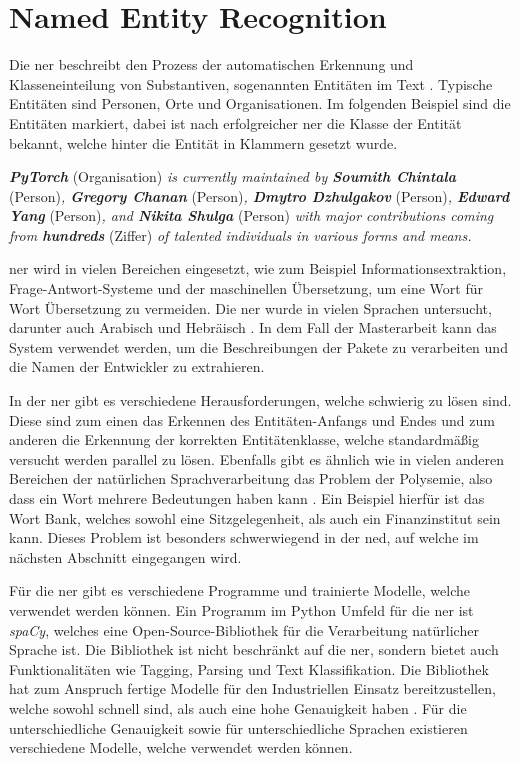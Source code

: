 \section{Named Entity Recognition}
\label{sec:named-entity-recognition}
Die \gls{ner} beschreibt den Prozess der automatischen Erkennung und Klasseneinteilung von Substantiven, sogenannten Entitäten im Text \autocite{mohit_named_2014}.
Typische Entitäten sind Personen, Orte und Organisationen.
Im folgenden Beispiel sind die Entitäten markiert, dabei ist nach erfolgreicher \gls{ner} die Klasse der Entität bekannt, welche hinter die Entität in Klammern gesetzt wurde.

\begin{addmargin}[25pt]{0pt}
    \emph{\textbf{PyTorch}} (Organisation) \emph{is currently maintained by \textbf{Soumith Chintala}} (Person)\emph{, \textbf{Gregory Chanan}} (Person)\emph{, \textbf{Dmytro Dzhulgakov}} (Person)\emph{, \textbf{Edward Yang}} (Person)\emph{, and \textbf{Nikita Shulga}} (Person) \emph{with major contributions coming from \textbf{hundreds}} (Ziffer) \emph{of talented individuals in various forms and means.}
\end{addmargin}

\gls{ner} wird in vielen Bereichen eingesetzt, wie zum Beispiel Informationsextraktion, Frage-Antwort-Systeme und der maschinellen Übersetzung, um eine Wort für Wort Übersetzung zu vermeiden.
Die \gls{ner} wurde in vielen Sprachen untersucht, darunter auch Arabisch und Hebräisch \autocite{mohit_named_2014}.
In dem Fall der Masterarbeit kann das System verwendet werden, um die Beschreibungen der Pakete zu verarbeiten und die Namen der Entwickler zu extrahieren.

In der \gls{ner} gibt es verschiedene Herausforderungen, welche schwierig zu lösen sind.
Diese sind zum einen das Erkennen des Entitäten-Anfangs und Endes und zum anderen die Erkennung der korrekten Entitätenklasse, welche standardmäßig versucht werden parallel zu lösen.
Ebenfalls gibt es ähnlich wie in vielen anderen Bereichen der natürlichen Sprachverarbeitung das Problem der Polysemie, also dass ein Wort mehrere Bedeutungen haben kann \autocite{mohit_named_2014}.
Ein Beispiel hierfür ist das Wort \glqq Bank\grqq{}, welches sowohl eine Sitzgelegenheit, als auch ein Finanzinstitut sein kann.
Dieses Problem ist besonders schwerwiegend in der \gls{ned}, auf welche im nächsten Abschnitt eingegangen wird.

Für die \gls{ner} gibt es verschiedene Programme und trainierte Modelle, welche verwendet werden können.
Ein Programm im Python Umfeld für die \gls{ner} ist \emph{spaCy}, welches eine Open-Source-Bibliothek für die Verarbeitung natürlicher Sprache ist.
Die Bibliothek ist nicht beschränkt auf die \gls{ner}, sondern bietet auch Funktionalitäten wie Tagging, Parsing und Text Klassifikation.
Die Bibliothek hat zum Anspruch fertige Modelle für den Industriellen Einsatz bereitzustellen, welche sowohl schnell sind, als auch eine hohe Genauigkeit haben \autocite{honnibal_spacy_2020}.
Für die unterschiedliche Genauigkeit sowie für unterschiedliche Sprachen existieren verschiedene Modelle, welche verwendet werden können.

